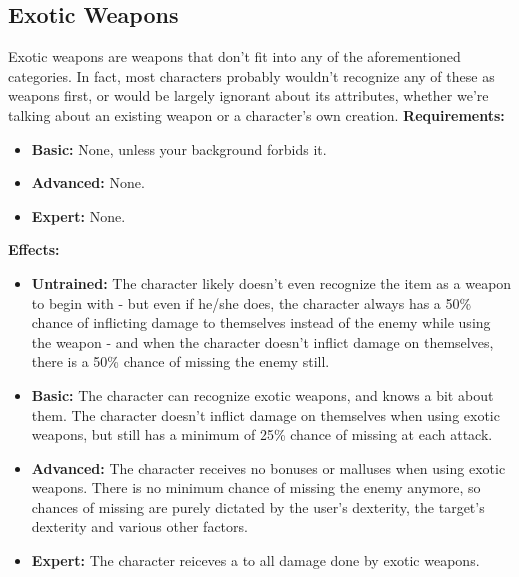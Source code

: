 \subsection{Exotic Weapons}
\begin{table}[!ht]
\centering
{}
\end{table}
Exotic weapons are weapons that don't fit into any of the aforementioned categories. In fact, most characters probably wouldn't recognize any of these as weapons first, or would be largely ignorant about its attributes, whether we're talking about an existing weapon or a character's own creation.
\textbf{Requirements:}
\begin{itemize}
	\item \textbf{Basic:} None, unless your background forbids it.
	\item \textbf{Advanced:} None.
	\item \textbf{Expert:} None.
\end{itemize}
\textbf{Effects:}
\begin{itemize}
	\item \textbf{Untrained:} The character likely doesn't even recognize the item as a weapon to begin with - but even if he/she does, the character always has a 50\% chance of inflicting damage to themselves instead of the enemy while using the weapon - and when the character doesn't inflict damage on themselves, there is a 50\% chance of missing the enemy still.
	\item \textbf{Basic:} The character can recognize exotic weapons, and knows a bit about them. The character doesn't inflict damage on themselves when using exotic weapons, but still has a minimum of 25\% chance of missing at each attack.
	\item \textbf{Advanced:} The character receives no bonuses or malluses when using exotic weapons. There is no minimum chance of missing the enemy anymore, so chances of missing are purely dictated by the user's dexterity, the target's dexterity and various other factors.
	\item \textbf{Expert:} The character reiceves a  to all damage done by exotic weapons.
\end{itemize}\newpage
